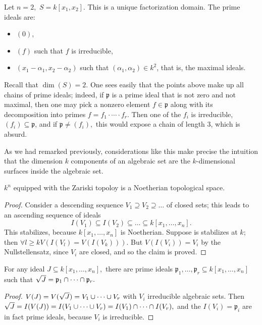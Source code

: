 \begin{example}
  Let \(n=2,\) \(S = k[x_1, x_2].\)
  This is a unique factorization domain. The prime ideals are:
  \begin{itemize}
  \item \((0)\),
  \item \((f)\) such that \(f\) is irreducible,
  \item \((x_1 - \alpha_1, x_2 - \alpha_2)\) such that \((\alpha_1, \alpha_2) \in k^2\), that is, the maximal ideals.
  \end{itemize}
  Recall that \(\dim(S) = 2.\) One sees easily that the points above make up all chains of prime ideals; indeed, if \(\mathfrak p\) is a prime ideal that is not zero and not maximal, then one may pick a nonzero element \(f \in \mathfrak p\) along with its decomposition into primes \(f = f_1 \cdot \dotsm \cdot f_r\). Then one of the \(f_i\) is irreducible, \((f_i) \subseteq \mathfrak p\), and if \(\mathfrak p \neq (f_i),\) this would expose a chain of length \(3\), which is absurd.

  As we had remarked previously, considerations like this make precise the intuition that the dimension \(k\) components of an algebraic set are the \(k\)-dimensional surfaces inside the algebraic set.
\end{example}

\begin{lemma}
  \(k^n\) equipped with the Zariski topoloy is a Noetherian topological space.
\end{lemma}
\begin{proof}
  Consider a descending sequence \(V_1 \supseteq V_2 \supseteq \dotso\) of closed sets; this leads to an ascending sequence of ideals
  \[I(V_1) \subseteq I(V_2) \subseteq \dotso \subseteq k[x_1, \dotsc, x_n].\]
  This stabilizes, because \(k[x_1, \dotsc, x_n]\) is Noetherian. Suppose is stabilizes at \(k\); then
  \(\forall l \geq k V(I(V_l) = V(I(V_k))).\)
  But \(V(I(V_i)) = V_i\) by the Nullstellensatz, since \(V_i\) are closed,
  and so the claim is proved.
\end{proof}

\begin{corollary}
  For any ideal \(J \subseteq k[x_1, \dotsc, x_n],\) there are prime ideals
  \(\mathfrak p_1, \dotsc, \mathfrak p_r \subseteq k[x_1, \dotsc, x_n]\)
  such that
  \(\sqrt{J} = \mathfrak p_1 \cap \dotsb \cap \mathfrak p_r.\)
\end{corollary}
\begin{proof}
  \(V(J) = V(\sqrt{J}) = V_1 \cup \dotsb \cup V_r\) with \(V_i\) irreducible algebraic sets. Then
  \(\sqrt{J} = I(V(J)) = I(V_1 \cup \dotsb \cup V_r) = I(V_1) \cap \dotsb \cap I(V_r),\)
  and the \(I(V_i) = \mathfrak p_i\) are in fact prime ideals, because \(V_i\) is irreducible.
\end{proof}






